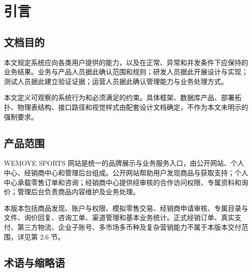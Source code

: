 \section{引言}\label{sec:1-引言}

\subsection{文档目的}\label{sec:11-文档目的}

本文规定系统应向各类用户提供的能力，以及在正常、异常和并发条件下应保持的业务结果。业务与产品人员据此确认范围和规则；研发人员据此开展设计与实现；测试人员据此建立验证证据；运营人员据此确认管理能力与业务处理方式。

本文定义可观察的系统行为和必须满足的约束。具体框架、数据库产品、部署拓扑、物理表结构、接口路径和视觉样式由配套设计文档确定，不作为本文未明示的强制要求。

\subsection{产品范围}\label{sec:12-产品范围}

WEMOVE SPORTS 网站是统一的品牌展示与业务服务入口，由公开网站、个人中心、经销商中心和管理后台组成。公开网站帮助用户发现商品与获取支持；个人中心承载零售订单和咨询；经销商中心提供经审核的合作访问权限、专属资料和询价；管理后台负责商品内容维护及业务处理。

本版本包括商品发现、账户与权限、模拟零售交易、经销商申请审核、专属目录与文件、询价回复、咨询工单、渠道管理和基本业务统计。正式经销订单、真实支付、第三方物流、企业子账号、多市场多币种及复杂营销能力不属于本版本交付范围，详见第 2.6 节。

\subsection{术语与缩略语}\label{sec:13-术语与缩略语}

